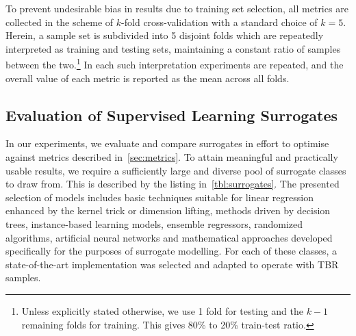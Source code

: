 To prevent undesirable bias in results due to training set selection, all metrics
are collected in the scheme of $k$-fold cross-validation with a standard choice of
$k=5$. Herein, a sample set is subdivided into 5 disjoint folds which are
repeatedly interpreted as training and testing sets, maintaining a constant
ratio of samples between the two.\footnote{Unless explicitly stated otherwise, we use 1
fold for testing and the $k-1$ remaining folds for training. This gives 80\% to
20\% train-test ratio.} In each such interpretation experiments are
repeated, and the overall value of each metric is reported as the mean across all folds.


\subsection{Evaluation of Supervised Learning Surrogates}
\label{sec:supervised}

In our experiments, we evaluate and compare surrogates in effort to
optimise against metrics described in~\cref{sec:metrics}. To attain meaningful
and practically usable results, we require a sufficiently large and diverse pool
of surrogate classes to draw from. This is described by the listing in~\cref{tbl:surrogates}. The presented selection of models includes basic
techniques suitable for linear regression enhanced by the kernel trick or dimension
lifting, methods driven by decision trees, instance-based learning models,
ensemble regressors, randomized algorithms, artificial neural networks and mathematical approaches
developed specifically for the purposes of surrogate modelling. For each of
these classes, a state-of-the-art implementation was selected and adapted to
operate with TBR samples.


